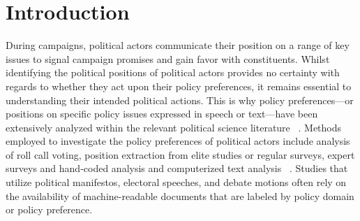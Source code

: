\documentclass[11pt]{article}
\begin{document}
\section{Introduction}
\label{intro}


During campaigns, political actors communicate their position on a range of key issues to signal campaign promises and gain favor with constituents. %
Whilst identifying the political positions of political actors provides no certainty with regards to whether they act upon their policy preferences, it remains essential to understanding their intended political actions. This is why policy preferences---or positions on specific policy issues expressed in speech or text---have been extensively analyzed within the relevant political science literature ~\cite{abercrombie2019policy,budge2001mapping,lowe2011scaling,volkens2013mapping}. Methods employed to investigate the policy preferences of political actors include analysis of roll call voting, position extraction from elite studies or regular surveys, expert surveys and hand-coded analysis and computerized text analysis ~\cite{debus2009estimating}. Studies that utilize political manifestos, electoral speeches, and debate motions often rely on the availability of machine-readable documents that are labeled by policy domain or policy preference.
\end{document}

